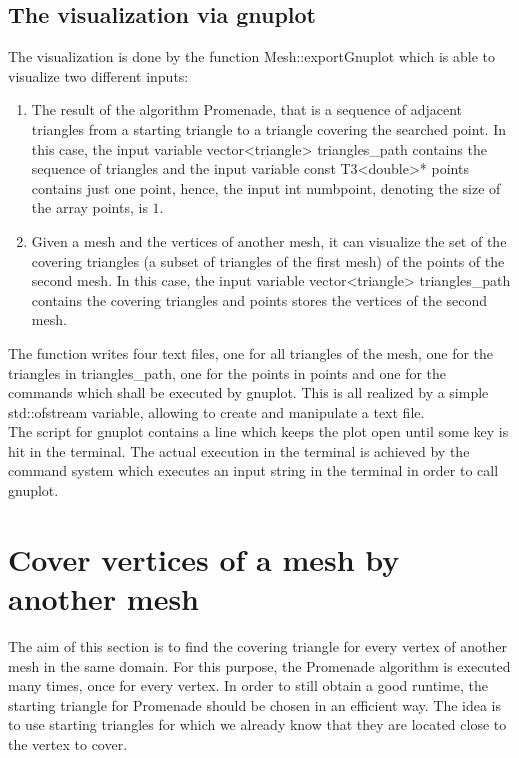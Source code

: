 \documentclass[10pt]{article}
\begin{document}
\subsection{The visualization via gnuplot} \label{visualization}
	The visualization is done by the function {\ttfamily Mesh::exportGnuplot} which is able to visualize two different inputs: 
	\begin{enumerate}
		\item 
		The result of the algorithm Promenade, that is a sequence of adjacent triangles from a starting triangle to a triangle covering the searched point. 
		In this case, the input variable {\ttfamily vector<triangle> triangles\_path} contains the sequence of triangles and the input variable {\ttfamily const T3<double>* points} contains just one point, hence, the input {\ttfamily int numbpoint}, denoting the size of the array {\ttfamily points}, is $ 1 $. 
		\item 
		Given a mesh and the vertices of another mesh, it can visualize the set of the covering triangles (a subset of triangles of the first mesh) of the points of the second mesh. 
		In this case, the input variable {\ttfamily vector<triangle> triangles\_path} contains the covering triangles and {\ttfamily points} stores the vertices of the second mesh. 
	\end{enumerate}
The function writes four text files, one for all triangles of the mesh, one for the triangles in {\ttfamily triangles\_path}, one for the points in {\ttfamily points} and one for the commands which shall be executed by {\ttfamily gnuplot}. This is all realized by a simple {\ttfamily std::ofstream} variable, allowing to create and manipulate a text file. \\
The script for {\ttfamily gnuplot} contains a line which keeps the plot open until some key is hit in the terminal. 
The actual execution in the terminal is achieved by the command {\ttfamily system} which executes an input string in the terminal in order to call {\ttfamily gnuplot}.

\section{Cover vertices of a mesh by another mesh}

The aim of this section is to find the covering triangle for every vertex of another mesh in the same domain. For this purpose, the Promenade algorithm is executed many times, once for every vertex. In order to still obtain a good runtime, the starting triangle for {\ttfamily Promenade} should be chosen in an efficient way. The idea is to use starting triangles for which we already know that they are located close to the vertex to cover.
\end{document}
